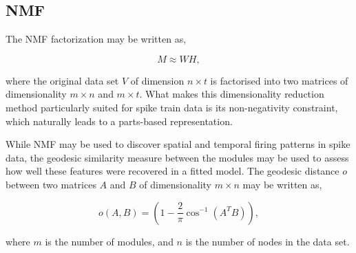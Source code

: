 \documentclass[mphil,deptreport,ianc]{infthesis} %
\begin{document}
\subsection{NMF}

The NMF factorization may be written as,

\begin{equation}
    M \approx WH,
\end{equation}

where the original data set $V$ of dimension $n \times t$ is factorised into two matrices of dimensionality $m \times n$ and $m \times t$.
What makes this dimensionality reduction method particularly suited for spike train data is its non-negativity constraint, which naturally leads to a parts-based representation. %

While NMF may be used to discover spatial and temporal firing patterns in spike data, the geodesic similarity measure between the modules may be used to assess how well these features were recovered in a fitted model.
The geodesic distance $o$ between two matrices $A$ and $B$ of dimensionality $m \times n$ may be written as,

\begin{equation}
    o(A, B) = (1-\frac{2}{\pi}\cos^{-1}(A^TB)),
\end{equation}

where $m$ is the number of modules, and $n$ is the number of nodes in the data set. 


\end{document}
